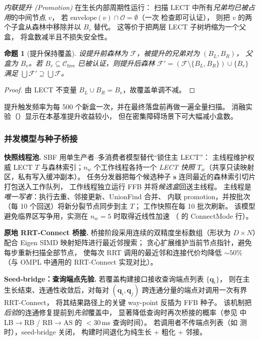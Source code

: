 \documentclass[journal]{IEEEtran}
\newtheorem{proposition}{命题}
\newcommand{\Cfree}{\mathcal{C}_{\mathrm{free}}}
\newcommand{\calO}{\mathcal{O}}
\begin{document}
\emph{内联提升 (Promotion)} 在生长内部周期性运行：
扫描 LECT 中所有\emph{兄弟均已被占用}的中间节点 $v$，
若 $\mathrm{envelope}(v)\cap\calO=\emptyset$（一次  检查即可认证），
则把 $v$ 的两个子盒从森林中移除并以 $B_v$ 替代。
这等价于把两层 LECT 子树坍缩为一个父盒，
将盒数减半且不损失安全性。

\begin{proposition}[提升保持覆盖]
设提升前森林为 $\mathcal{F}$，被提升的兄弟对为 $(B_L,B_R)$，
父盒为 $B_v$。若 $B_v\subseteq\Cfree$ 已被认证，则提升后森林
$\mathcal{F}'=(\mathcal{F}\setminus\{B_L,B_R\})\cup\{B_v\}$
满足 $\bigcup\mathcal{F}'\supseteq\bigcup\mathcal{F}$。
\end{proposition}

\begin{proof}
由 LECT 不变量 $B_L\cup B_R=B_v$，故覆盖单调不减。
\end{proof}

提升触发频率为每 500 个新盒一次，并在最终落盘前再做一遍全量扫描。
消融实验（）显示在本基准提升收益较小，
但在密集障碍场景下可大幅减小盒数。

\subsubsection{并发模型与种子桥接}\label{sec:grower_concurrency}

\textbf{快照线程池.}
SBF 用单生产者--多消费者模型替代“锁住主 LECT”：
主线程维护权威 LECT $T$ 与森林索引；$n_w$ 个工作线程各持一个
\emph{LECT 快照} $T_w$（共享只读映射区，私有写入缓冲副本）。
任务分发器把每个候选种子 $\bm{s}$ 连同最近的森林索引切片打包送入工作队列，
工作线程独立运行 FFB 并将\emph{候选盒}回送主线程。
主线程是\emph{唯一写者}：执行去重、邻接更新、UnionFind 合并、
内联 promotion，并按批次（每 10 个回送）将新分裂节点同步到主 $T$；
工作快照在每 10 批次刷新。
该模型避免临界区写争用，实测在 $n_w=5$ 时取得近线性加速
（ 的 ConnectMode 行）。

\textbf{原地 RRT-Connect 桥接.}
桥接阶段采用连续的双精度坐标数组（形状为 $D{\times}N$）配合 Eigen
SIMD 映射矩阵进行最近邻搜索；
贪心扩展维护当前节点指针，避免每步重新扫描全部节点，
使每次 RRT 调用的最近邻和连接代价均降低 $\sim\!50\%$
（与 OMPL 中通用的 RRT-Connect 实现对比）。

\textbf{Seed-bridge：查询端点先验.}
若覆盖构建接口接收查询端点列表 $\{\bm{q}_i\}$，
则在主生长结束、连通性收敛后，对每对 $(\bm{q}_i,\bm{q}_j)$
跨连通分量的端点对调用一次有界 RRT-Connect，
将其结果路径上的关键 way-point 反插为 FFB 种子。
该机制把\emph{后验}的连通修复提前到\emph{先验}覆盖中，
显著降低查询时再次桥接的概率（参见  中
LB$\to$RB / RB$\to$AS 的 $<$30\,ms 查询时间）。
若调用者不传端点列表（如  测时），seed-bridge 关闭，
构建时间退化为纯生长 + 粗化 + 邻接。
\end{document}
